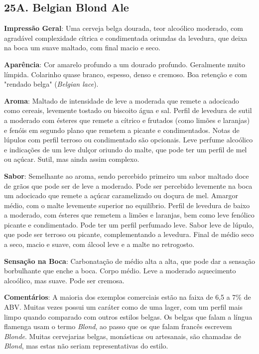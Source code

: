 \subsection*{25A. Belgian Blond Ale}
\textbf{Impressão Geral}: Uma cerveja belga dourada, teor alcoólico moderado, com agradável complexidade cítrica e condimentada oriundas da levedura, que deixa na boca um suave maltado, com final macio e seco.

\textbf{Aparência}: Cor amarelo profundo a um dourado profundo. Geralmente muito límpida. Colarinho quase branco, espesso, denso e cremoso. Boa retenção e com "rendado belga" (\textit{Belgian lace}).

\textbf{Aroma}: Maltado de intensidade de leve a moderada que remete a adocicado como cereais, levemente tostado ou biscoito água e sal. Perfil de levedura de sutil a moderado com ésteres que remete a cítrico e frutados (como limões e laranjas) e fenóis em segundo plano que remetem a picante e condimentados. Notas de lúpulos com perfil terroso ou condimentado são opcionais. Leve perfume alcoólico e indicações de um leve dulçor oriundo do malte, que pode ter um perfil de mel ou açúcar. Sutil, mas ainda assim complexo.

\textbf{Sabor}: Semelhante ao aroma, sendo percebido primeiro um sabor maltado doce de grãos que pode ser de leve a moderado. Pode ser percebido levemente na boca um adocicado que remete a açúcar caramelizado ou doçura de mel. Amargor médio, com o malte levemente superior no equilíbrio. Perfil de levedura de baixo a moderado, com ésteres que remetem a limões e laranjas, bem como leve fenólico picante e condimentado. Pode ter um perfil perfumado leve. Sabor leve de lúpulo, que pode ser terroso ou picante, complementando a levedura. Final de médio seco a seco, macio e suave, com álcool leve e a malte no retrogosto.

\textbf{Sensação na Boca}: Carbonatação de médio alta a alta, que pode dar a sensação borbulhante que enche a boca. Corpo médio. Leve a moderado aquecimento alcoólico, mas suave. Pode ser cremosa.

\textbf{Comentários}: A maioria dos exemplos comerciais estão na faixa de 6,5 a 7\% de ABV. Muitas vezes possui um caráter como de uma lager, com um perfil mais limpo quando comparado com outros estilos belgas. Os belgas que falam a língua flamenga usam o termo \textit{Blond}, ao passo que os que falam francês escrevem \textit{Blonde}. Muitas cervejarias belgas, monásticas ou artesanais, são chamadas de \textit{Blond}, mas estas não seriam representativas do estilo.

